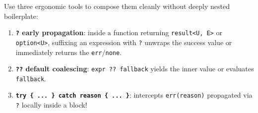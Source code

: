 \documentclass[
  english,
  oneside]{book}
\newcounter{none} %
\providecommand{\tightlist}{%
  \setlength{\itemsep}{0pt}\setlength{\parskip}{0pt}}
\begin{document}
Use three ergonomic tools to compose them cleanly without deeply nested
boilerplate:

\begin{enumerate}
\def\labelenumi{\arabic{enumi}.}
\tightlist
\item
  \textbf{\texttt{?} early propagation}: inside a function returning
  \texttt{result\textless{}U,\ E\textgreater{}} or
  \texttt{option\textless{}U\textgreater{}}, suffixing an expression
  with \texttt{?} unwraps the success value or immediately returns the
  \texttt{err}/\texttt{none}.
\item
  \textbf{\texttt{??} default coalescing}: \texttt{expr\ ??\ fallback}
  yields the inner value or evaluates \texttt{fallback}.
\item
  \textbf{\texttt{try\ \{\ ...\ \}\ catch\ reason\ \{\ ...\ \}}}:
  intercepts \texttt{err(reason)} propagated via \texttt{?} locally
  inside a block!
\end{enumerate}
\end{document}
